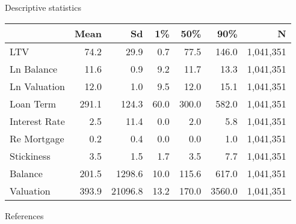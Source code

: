 \documentclass[aspectratio=169]{beamer}  %
\begin{document}
\begin{frame}[label=descriptives]{Descriptive statistics \hyperlink{links}{}}
    \begin{table}
        \centering
        \begin{tabular}{lrrrrrr}
            \toprule
            & \textbf{Mean} & \textbf{Sd} & \textbf{1\%} & \textbf{50\%} & \textbf{90\%} & \textbf{N} \\
            \midrule
            LTV            & 74.2 & 29.9 & 0.7 & 77.5 & 146.0 & 1,041,351 \\
            Ln Balance     & 11.6 & 0.9  & 9.2 & 11.7 & 13.3  & 1,041,351 \\
            Ln Valuation   & 12.0 & 1.0  & 9.5 & 12.0 & 15.1  & 1,041,351 \\
            Loan Term      & 291.1 & 124.3 & 60.0 & 300.0 & 582.0 & 1,041,351 \\
            Interest Rate  & 2.5 & 11.4 & 0.0 & 2.0 & 5.8 & 1,041,351 \\
            Re Mortgage    & 0.2 & 0.4 & 0.0 & 0.0 & 1.0 & 1,041,351 \\
            Stickiness     & 3.5 & 1.5 & 1.7 & 3.5 & 7.7 & 1,041,351 \\
            Balance        & 201.5 & 1298.6 & 10.0 & 115.6 & 617.0 & 1,041,351 \\
            Valuation      & 393.9 & 21096.8 & 13.2 & 170.0 & 3560.0 & 1,041,351 \\
            \bottomrule
        \end{tabular}
    \end{table}
\end{frame}


\begin{frame}[allowframebreaks]{References}
    
    
\end{frame}
\end{document}
